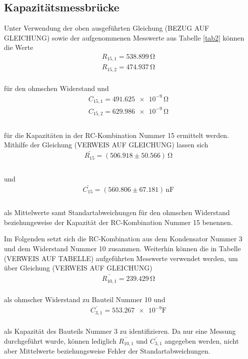 \subsection{Kapazitätsmessbrücke}

Unter Verwendung der oben ausgeführten Gleichung (BEZUG AUF GLEICHUNG) sowie der aufgenommenen
Messwerte aus Tabelle \ref{tab2} können die Werte 
\begin{align}
R_{15,1} = 538.899\,\si{\ohm} \nonumber \\
R_{15,2} = 474.937\,\si{\ohm} \nonumber  
\end{align}
\\
für den ohmschen Widerstand und
\begin{align}
C_{15,1} = \num{491.625e-9}\,\si{\ohm} \nonumber \\
C_{15,2} = \num{629.986e-9}\,\si{\ohm} \nonumber \\ 
\end{align}
\\
für die Kapazitäten in der RC-Kombination Nummer 15 ermittelt werden. Mithilfe der Gleichung (VERWEIS AUF GLEICHUNG)
lassen sich 
\begin{align}
\bar{R_{15}} = (506.918 \pm 50.566)\, \si{\ohm} \nonumber \\
\end{align}
\\
und
\begin{align}
\bar{C_{15}} = (560.806 \pm 67.181)\, \si{\nano\farad} \nonumber \\
\end{align}
\\
als Mittelwerte samt Standartabweichungen für den ohmschen Widerstand beziehungsweise der
Kapazität der RC-Kombination Nummer 15 benennen.



Im Folgenden setzt sich die RC-Kombination aus dem Kondensator Nummer 3 und dem Widerstand Nummer 10 zusammen. Weiterhin 
können die in Tabelle (VERWEIS AUF TABELLE) aufgeführten Messwerte verwendet werden, um über Gleichung
(VERWEIS AUF GLEICHUNG) 
\begin{align}
\bar{R_{10,1}} = 239.429\, \si{\ohm} \nonumber
\end{align}
\\
als ohmscher Widerstand zu Bauteil Nummer 10 und
\begin{align}
\bar{C_{3,1}} = \num{553.267e-9} \si{\farad} \nonumber
\end{align}
\\
als Kapazität des Bauteils Nummer 3 zu identifizieren. Da nur eine Messung durchgeführt wurde, können lediglich $\bar{R_{10,1}}$
und $\bar{C_{3,1}}$ angegeben werden, nicht aber Mittelwerte beziehungsweise Fehler der Standartabweichungen.


